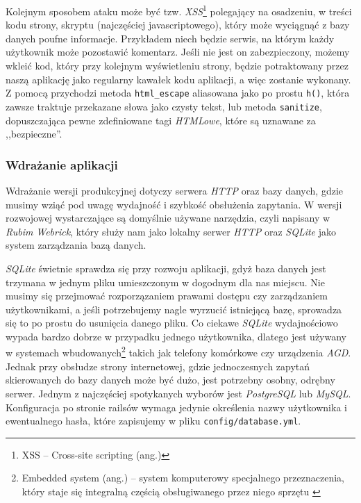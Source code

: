 \documentclass[a4paper,12pt]{article}
\begin{document}
Kolejnym sposobem ataku może być tzw. \emph{XSS}\footnote{XSS -- Cross-site scripting
(ang.)} polegający na osadzeniu, w treści kodu strony, skryptu (najczęściej
javascriptowego), który może wyciągnąć z bazy danych poufne informacje. Przykładem niech
będzie serwis, na którym każdy użytkownik może pozostawić komentarz. Jeśli nie jest on
zabezpieczony, możemy wkleić kod, który przy kolejnym wyświetleniu strony, będzie potraktowany
przez naszą aplikację jako regularny kawałek kodu aplikacji, a więc zostanie wykonany.\\
Z pomocą przychodzi metoda \texttt{html\_escape} aliasowana jako po prostu \texttt{h()},
która zawsze traktuje przekazane słowa jako czysty tekst, lub metoda \texttt{sanitize},
dopuszczająca pewne zdefiniowane tagi \emph{HTMLowe}, które są uznawane za ,,bezpieczne''.


\subsubsection{Wdrażanie aplikacji}
Wdrażanie wersji produkcyjnej dotyczy serwera \emph{HTTP} oraz bazy danych, gdzie musimy
wziąć pod uwagę wydajność i szybkość obsłużenia zapytania. W wersji rozwojowej
wystarczające są domyślnie używane narzędzia, czyli napisany w \emph{Rubim} \emph{Webrick},
który służy nam jako lokalny serwer \emph{HTTP} oraz \emph{SQLite} jako system
zarządzania bazą danych.


\emph{SQLite} świetnie sprawdza się przy rozwoju aplikacji, gdyż baza danych jest trzymana
w jednym pliku umieszczonym w dogodnym dla nas miejscu. Nie musimy się przejmować
rozporzązaniem prawami dostępu czy zarządzaniem użytkownikami, a jeśli potrzebujemy nagle
wyrzucić istniejącą bazę, sprowadza się to po prostu do usunięcia danego pliku.
Co ciekawe \emph{SQLite} wydajnościowo wypada bardzo dobrze w przypadku jednego
użytkownika, dlatego jest używany w systemach wbudowanych\footnote{Embedded system (ang.) --
system komputerowy specjalnego przeznaczenia, który staje się integralną częścią
obsługiwanego przez niego sprzętu \cite{embedded-system}} takich jak telefony komórkowe
czy urządzenia \emph{AGD}. Jednak przy obsłudze strony internetowej, gdzie jednoczesnych zapytań
skierowanych do bazy danych może być dużo, jest potrzebny osobny, odrębny serwer. Jednym
z najczęściej spotykanych wyborów jest \emph{PostgreSQL} lub \emph{MySQL}. Konfiguracja
po stronie railsów wymaga jedynie określenia nazwy użytkownika i ewentualnego hasła, które
zapisujemy w pliku \texttt{config/database.yml}.
\end{document}
